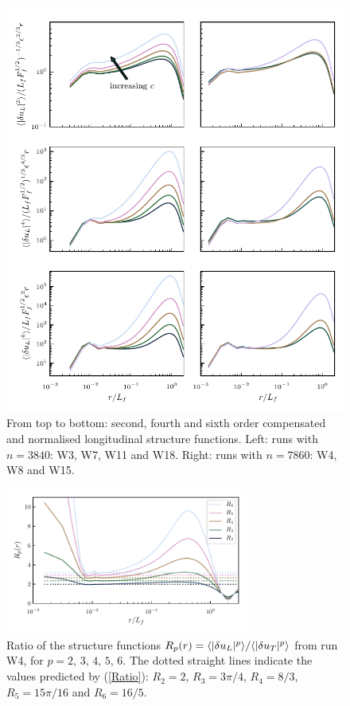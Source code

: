 \begin{figure}
\centerline{
\includegraphics[width=5.0in]{../Pyfig/fig_struct_order_246}}
\caption{From top to bottom: second, fourth and sixth order compensated and
normalised longitudinal structure functions. Left: runs with $ n=3840 $: W3,
W7, W11 and W18. Right: runs with $ n = 7860 $: W4, W8 and W15. }
\label{fig_StrucFunc}
\end{figure}

\begin{figure}
\centerline{\includegraphics[width=8cm]{../Pyfig/fig_ratio_strfct}}
\caption{
Ratio of the structure functions
$R_p(r) = \langle |\delta u_L|^p \rangle / \langle |\delta u_T|^p \rangle$ from run W4,
for $ p = 2, \, 3, \, 4, \, 5, \, 6. $
The dotted straight lines indicate the values predicted by (\ref{Ratio}):
$R_2 = 2$, $R_3 = 3\pi/4$,  $R_4 = 8/3$, $ R_5 = 15 \pi /16 $ and $ R_6 = 16/5 $.}
\label{fig_ratio}
\end{figure}

